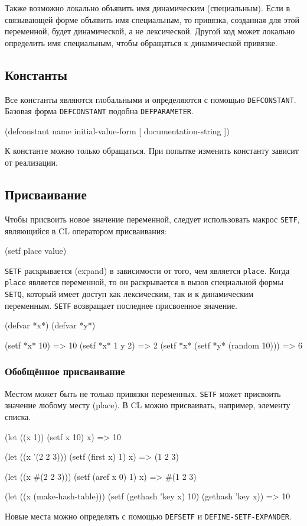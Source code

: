 Также возможно локально объявить имя динамическим (специальным). Если в связывающей форме объявить имя специальным, то привязка, созданная для этой переменной, будет динамической, а не лексической. Другой код может локально определить имя специальным, чтобы обращаться к динамической привязке.

\subsection{Константы}
Все константы являются глобальными и определяются с помощью \lstinline{DEFCONSTANT}. Базовая форма \lstinline{DEFCONSTANT} подобна \lstinline{DEFPARAMETER}.
\begin{cllst}{}{}
(defconstant name initial-value-form [ documentation-string ])
\end{cllst}

К константе можно только обращаться. При попытке изменить константу зависит от реализации.

\subsection{Присваивание}
Чтобы присвоить новое значение переменной, следует использовать макрос \lstinline{SETF}, являющийся в CL оператором присваивания:
\begin{cllst}{}{}
(setf place value)
\end{cllst}

\lstinline{SETF} раскрывается (expand) в зависимости от того, чем является \lstinline{place}. Когда \lstinline{place} является переменной, то он раскрывается в вызов специальной формы \lstinline{SETQ}, который имеет доступ как лексическим, так и к динамическим переменным. \lstinline{SETF} возвращает последнее присвоенное значение.
\begin{cllst}{}{}
(defvar *x*)
(defvar *y*)

(setf *x* 10) => 10
(setf *x* 1 y 2) => 2
(setf *x* (setf *y* (random 10))) => 6
\end{cllst}

\subsubsection{Обобщённое присваивание}
Местом может быть не только привязки переменных. \lstinline{SETF} может присвоить значение любому месту (place). В CL можно присваивать, например, элементу списка.
\begin{cllst}{}{}
(let ((x 1))
  (setf x 10)
  x) => 10

(let ((x '(2 2 3)))
  (setf (first x) 1)
  x) => (1 2 3)

(let ((x #(2 2 3)))
  (setf (aref x 0) 1)
  x) => #(1 2 3)

(let ((x (make-hash-table)))
  (setf (gethash 'key x) 10)
  (gethash 'key x)) => 10
\end{cllst}

Новые места можно определять с помощью \lstinline{DEFSETF} и \lstinline{DEFINE-SETF-EXPANDER}.
